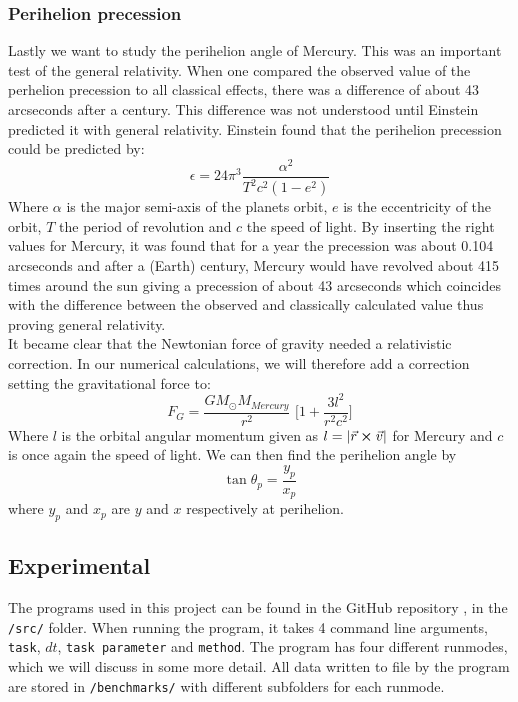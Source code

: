 \documentclass{article}
\newcommand{\TomH}[1]{\Big[ #1 \Big]}
\begin{document}
\subsubsection{Perihelion precession}
Lastly we want to study the perihelion angle of Mercury. This was an important test of the general relativity. When one compared the observed value of the perhelion precession to all classical effects, there was a difference of about 43 arcseconds after a century. This difference was not understood until Einstein predicted it with general relativity.\cite{Perhelion} Einstein found that the perihelion precession could be predicted by:
\begin{equation}
\epsilon = 24 \pi^3 \frac{\alpha^2}{T^2 c^2 (1 - e^2)}
\label{eq:perihelion}
\end{equation}
Where $\alpha$ is the major semi-axis of the planets orbit, $e$ is the eccentricity of the orbit, $T$ the period of revolution and $c$ the speed of light. By inserting the right values for Mercury, it was found that for a year the precession was about 0.104 arcseconds and after a (Earth) century, Mercury would have revolved about 415 times around the sun giving a precession of about 43 arcseconds which coincides with the difference between the observed and classically calculated value thus proving general relativity. \\
It became clear that the Newtonian force of gravity needed a relativistic correction. In our numerical calculations, we will therefore add a correction setting the gravitational force to:
\begin{equation}
F_G = \frac{G M_{\odot} M_{Mercury}}{r^2} \, \, \TomH{1 + \frac{3l^2}{r^2c^2}}
\label{eq:FgGR}
\end{equation}
Where $l$ is the orbital angular momentum given as $l = |\vec{r} \cross \vec{v}|$ for Mercury and $c$ is once again the speed of light.
We can then find the perihelion angle by
\begin{equation}
\tan \theta_p = \frac{y_p}{x_p}
\end{equation}
where $y_p$ and $x_p$ are $y$ and $x$ respectively at perihelion.
\subsection{Experimental}
The programs used in this project can be found in the GitHub repository \cite{Github}, in the \texttt{/src/} folder. When running the program, it takes 4 command line arguments, \texttt{task}, $dt$, \texttt{task parameter} and \texttt{method}. The program has four different runmodes, which we will discuss in some more detail. All data written to file by the program are stored in \texttt{/benchmarks/} with different subfolders for each runmode.
\end{document}
